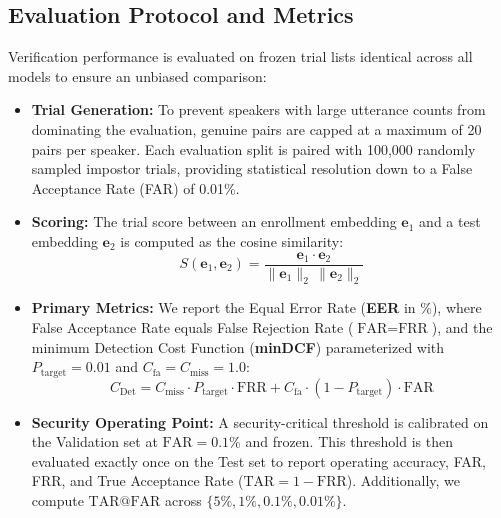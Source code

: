 \subsection{Evaluation Protocol and Metrics}

Verification performance is evaluated on frozen trial lists identical across all models to ensure an unbiased comparison:

\begin{itemize}
    \item \textbf{Trial Generation:} To prevent speakers with large utterance counts from dominating the evaluation, genuine pairs are capped at a maximum of 20 pairs per speaker. Each evaluation split is paired with 100{,}000 randomly sampled impostor trials, providing statistical resolution down to a False Acceptance Rate (FAR) of 0.01\%.
    \item \textbf{Scoring:} The trial score between an enrollment embedding $\boldsymbol{e}_1$ and a test embedding $\boldsymbol{e}_2$ is computed as the cosine similarity:
    \begin{equation}
        S(\boldsymbol{e}_1, \boldsymbol{e}_2) = \frac{\boldsymbol{e}_1 \cdot \boldsymbol{e}_2}{\|\boldsymbol{e}_1\|_2 \, \|\boldsymbol{e}_2\|_2}
    \end{equation}
    \item \textbf{Primary Metrics:} We report the Equal Error Rate (\textbf{EER} in \%), where False Acceptance Rate equals False Rejection Rate ($\text{FAR} = \text{FRR}$), and the minimum Detection Cost Function (\textbf{minDCF}) parameterized with $P_{\text{target}} = 0.01$ and $C_{\text{fa}} = C_{\text{miss}} = 1.0$:
    \begin{equation}
        C_{\text{Det}} = C_{\text{miss}} \cdot P_{\text{target}} \cdot \text{FRR} + C_{\text{fa}} \cdot (1 - P_{\text{target}}) \cdot \text{FAR}
    \end{equation}
    \item \textbf{Security Operating Point:} A security-critical threshold is calibrated on the Validation set at $\text{FAR} = 0.1\%$ and frozen. This threshold is then evaluated exactly once on the Test set to report operating accuracy, FAR, FRR, and True Acceptance Rate ($\text{TAR} = 1 - \text{FRR}$). Additionally, we compute $\text{TAR@FAR}$ across $\{5\%, 1\%, 0.1\%, 0.01\%\}$.
\end{itemize}
